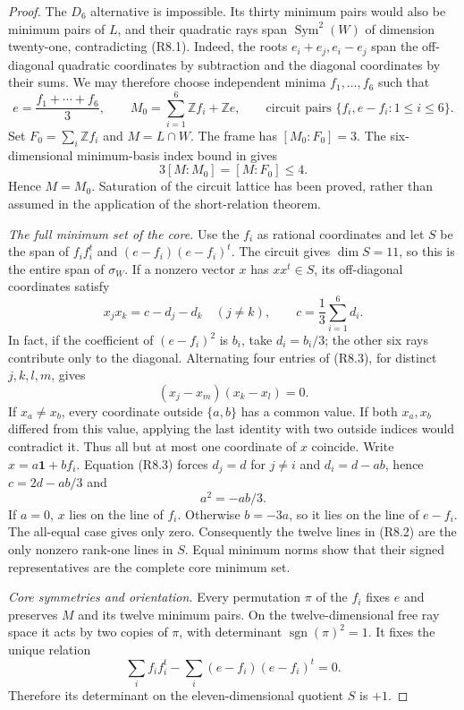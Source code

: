 \begin{proof}
The $D_6$ alternative is impossible. Its thirty minimum pairs would
also be minimum pairs of $L$, and their quadratic rays span
$\operatorname{Sym}^2(W)$ of dimension twenty-one, contradicting
(R8.1). Indeed, the roots $e_i+e_j,e_i-e_j$ span the off-diagonal
quadratic coordinates by subtraction and the diagonal coordinates
by their sums. We may therefore choose independent minima
$f_1,\ldots,f_6$ such that
\[
 e=\frac{f_1+\cdots+f_6}{3},\qquad
 M_0=\sum_{i=1}^6\mathbb Zf_i+\mathbb Ze,
 \qquad
 \text{circuit pairs }\{f_i,e-f_i:1\leq i\leq6\}.        \tag{R8.2}
\]
Set $F_0=\sum_i\mathbb Zf_i$ and $M=L\cap W$. The frame has
$[M_0:F_0]=3$. The six-dimensional minimum-basis index bound in
\cite[Theorem~5.2]{MartinetIndex2001} gives
\[
                   3[M:M_0]=[M:F_0]\leq4.
\]
Hence $M=M_0$. Saturation of the circuit lattice has been proved,
rather than assumed in the application of the short-relation theorem.

\medskip\noindent
\emph{The full minimum set of the core.}
Use the $f_i$ as rational coordinates and let $S$ be the span of
$f_if_i^t$ and $(e-f_i)(e-f_i)^t$. The circuit gives $\dim S=11$,
so this is the entire span of $\sigma_W$. If a nonzero vector $x$
has $xx^t\in S$, its off-diagonal coordinates satisfy
\[
 x_jx_k=c-d_j-d_k\quad(j\ne k),
 \qquad c=\frac13\sum_{i=1}^6d_i.                       \tag{R8.3}
\]
In fact, if the coefficient of $(e-f_i)^2$ is $b_i$, take
$d_i=b_i/3$; the other six rays contribute only to the diagonal.
Alternating four entries of (R8.3), for distinct $j,k,l,m$, gives
\[
                       (x_j-x_m)(x_k-x_l)=0.
\]
If $x_a\ne x_b$, every coordinate outside $\{a,b\}$ has a common
value. If both $x_a,x_b$ differed from this value, applying the last
identity with two outside indices would contradict it. Thus all but
at most one coordinate of $x$ coincide. Write $x=a\mathbf1+bf_i$.
Equation (R8.3) forces $d_j=d$ for $j\ne i$ and $d_i=d-ab$, hence
$c=2d-ab/3$ and
\[
                         a^2=-ab/3.
\]
If $a=0$, $x$ lies on the line of $f_i$. Otherwise $b=-3a$,
so it lies on the line of $e-f_i$. The all-equal case gives only
zero. Consequently the twelve lines in (R8.2) are the only nonzero
rank-one lines in $S$. Equal minimum norms show that their signed
representatives are the complete core minimum set.

\medskip\noindent
\emph{Core symmetries and orientation.}
Every permutation $\pi$ of the $f_i$ fixes $e$ and preserves $M$
and its twelve minimum pairs. On the twelve-dimensional free ray
space it acts by two copies of $\pi$, with determinant
$\operatorname{sgn}(\pi)^2=1$. It fixes the unique relation
\[
             \sum_i f_if_i^t-\sum_i(e-f_i)(e-f_i)^t=0.   \tag{R8.4}
\]
Therefore its determinant on the eleven-dimensional quotient $S$
is $+1$.


\end{proof}

